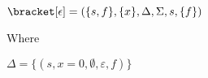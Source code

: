 $\bracket[\epsilon]
=(\{s, f\}, \{x\},\Delta,\Sigma,s,\{f\})$

Where

$\Delta=\{(s,x=0,\emptyset,\varepsilon,f)\}$